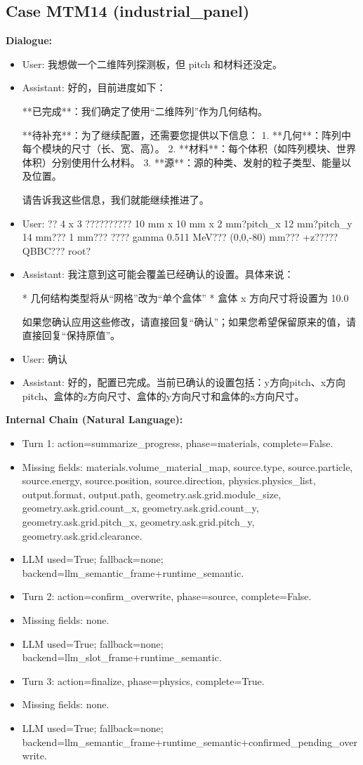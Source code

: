 \documentclass[11pt]{ctexart}
\begin{document}
\subsection{Case MTM14 (industrial\_panel)}
\textbf{Dialogue:}
\begin{itemize}
\item User: 我想做一个二维阵列探测板，但 pitch 和材料还没定。
\item Assistant: 好的，目前进度如下：

**已完成**：我们确定了使用“二维阵列”作为几何结构。

**待补充**：为了继续配置，还需要您提供以下信息：
1.  **几何**：阵列中每个模块的尺寸（长、宽、高）。
2.  **材料**：每个体积（如阵列模块、世界体积）分别使用什么材料。
3.  **源**：源的种类、发射的粒子类型、能量以及位置。

请告诉我这些信息，我们就能继续推进了。
\item User: ?? 4 x 3 ?????????? 10 mm x 10 mm x 2 mm?pitch\_x 12 mm?pitch\_y 14 mm??? 1 mm??? ???? gamma 0.511 MeV??? (0,0,-80) mm??? +z????? QBBC??? root?
\item Assistant: 我注意到这可能会覆盖已经确认的设置。具体来说：

*   几何结构类型将从“网格”改为“单个盒体”
*   盒体 x 方向尺寸将设置为 10.0

如果您确认应用这些修改，请直接回复“确认”；如果您希望保留原来的值，请直接回复“保持原值”。
\item User: 确认
\item Assistant: 好的，配置已完成。当前已确认的设置包括：y方向pitch、x方向pitch、盒体的z方向尺寸、盒体的y方向尺寸和盒体的x方向尺寸。
\end{itemize}
\textbf{Internal Chain (Natural Language):}
\begin{itemize}
\item Turn 1: action=summarize\_progress, phase=materials, complete=False.
\item Missing fields: materials.volume\_material\_map, source.type, source.particle, source.energy, source.position, source.direction, physics.physics\_list, output.format, output.path, geometry.ask.grid.module\_size, geometry.ask.grid.count\_x, geometry.ask.grid.count\_y, geometry.ask.grid.pitch\_x, geometry.ask.grid.pitch\_y, geometry.ask.grid.clearance.
\item LLM used=True; fallback=none; backend=llm\_semantic\_frame+runtime\_semantic.
\item Turn 2: action=confirm\_overwrite, phase=source, complete=False.
\item Missing fields: none.
\item LLM used=True; fallback=none; backend=llm\_slot\_frame+runtime\_semantic.
\item Turn 3: action=finalize, phase=physics, complete=True.
\item Missing fields: none.
\item LLM used=True; fallback=none; backend=llm\_semantic\_frame+runtime\_semantic+confirmed\_pending\_overwrite.
\end{itemize}
\end{document}
